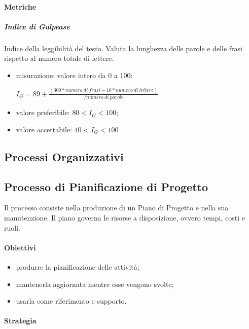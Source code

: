 		\paragraph{Metriche}
			\subparagraph{Indice di Gulpease}
			Indice della leggibilità del testo. Valuta la lunghezza delle parole e delle frasi rispetto al numero totale di lettere. 
			\begin{itemize}
				\item misurazione: valore intero da 0 a 100:\newline 
				
				$I_G = 89+ \frac{(300 * numero\ di\ frasi - 10 * numero\ di\ lettere)}{/numero\ di\ parole}$	
				\item valore preferibile: $80 < I_G < 100$;
				\item valore accettabile: $40 < I_G < 100$	
			\end{itemize}
		
\subsection{Processi Organizzativi}
	\subsection{Processo di Pianificazione di Progetto}
	Il processo consiste nella produzione di un Piano di Progetto e nella sua manutenzione. Il piano governa le risorse a disposizione, ovvero tempi, costi e ruoli.
		\paragraph{Obiettivi}
		\begin{itemize}
			\item produrre la pianificazione delle attività;
			\item mantenerla aggiornata mentre esse vengono svolte;
			\item usarla come riferimento e supporto.
		\end{itemize}
		\paragraph{Strategia}
